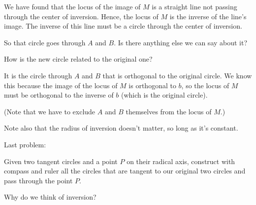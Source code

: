We have found that the locus of the image of $M$ is a straight line not passing through the center of inversion.  Hence, the locus of $M$ is the inverse of the line's image.  The inverse of this line must be a circle through the center of inversion.

So that circle goes through $A$ and $B$.  Is there anything else we can say about it?

How is the new circle related to the original one?




It is the circle through $A$ and $B$ that is orthogonal to the original circle.  We know this because the image of the locus of $M$ is orthogonal to $b$, so the locus of $M$ must be orthogonal to the inverse of $b$ (which is the original circle).

(Note that we have to exclude $A$ and $B$ themselves from the locus of $M$.)

Note also that the radius of inversion doesn't matter, so long as it's constant.

Last problem:

\begin{example}
Given two tangent circles and a point $P$ on their radical axis, construct with compass and ruler all the circles that are tangent to our original two circles and pass through the point $P$.
    
\end{example}

Why do we think of inversion?



